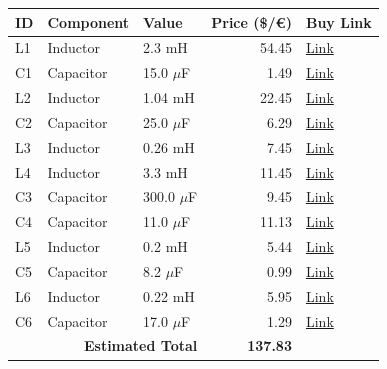 \begin{table}[H]
    \centering
    \renewcommand{\arraystretch}{1.5}
    \begin{tabular}{@{}lllrl@{}}
        \toprule
        \textbf{ID} & \textbf{Component} & \textbf{Value} & \textbf{Price (\$/€)} & \textbf{Buy Link} \\
        \midrule
        L1 & Inductor & 2.3 mH & 54.45 & \href{https://www.soundimports.eu/en/jantzen-audio-000-8690.html}{Link} \\
        C1 & Capacitor & 15.0 $\mu$F & 1.49 & \href{https://www.soundimports.eu/en/jantzen-audio-001-6141.html}{Link} \\
        L2 & Inductor & 1.04 mH & 22.45 & \href{https://www.soundimports.eu/en/jantzen-audio-000-1047.html}{Link} \\
        C2 & Capacitor & 25.0 $\mu$F & 6.29 & \href{https://www.parts-express.com/Dayton-Audio-PMPC-25-25uF-250V-Precision-Audio-Capacitor-027-256}{Link} \\
        L3 & Inductor & 0.26 mH & 7.45 & \href{https://www.soundimports.eu/en/jantzen-audio-000-1728.html}{Link} \\
        L4 & Inductor & 3.3 mH & 11.45 & \href{https://www.soundimports.eu/en/jantzen-audio-000-5161.html}{Link} \\
        C3 & Capacitor & 300.0 $\mu$F & 9.45 & \href{https://www.soundimports.eu/en/jantzen-audio-001-6186.html}{Link} \\
        C4 & Capacitor & 11.0 $\mu$F & 11.13 & \href{https://www.parts-express.com/Solen-11uF-400V-Polypropylene-Capacitor-027-571}{Link} \\
        L5 & Inductor & 0.2 mH & 5.44 & \href{https://www.soundimports.eu/en/dayton-audio-lw18-20.html}{Link} \\
        C5 & Capacitor & 8.2 $\mu$F & 0.99 & \href{https://www.soundimports.eu/en/it-intertechnik-elcr-8-2-100.html}{Link} \\
        L6 & Inductor & 0.22 mH & 5.95 & \href{https://www.soundimports.eu/en/dayton-audio-lw18-22.html}{Link} \\
        C6 & Capacitor & 17.0 $\mu$F & 1.29 & \href{https://www.parts-express.com/17uF-100V-Non-Polarized-Capacitor-027-346}{Link} \\
        \midrule
        \multicolumn{3}{r}{\textbf{Estimated Total}} & \textbf{137.83} & \\
        \bottomrule
    \end{tabular}
\end{table}
